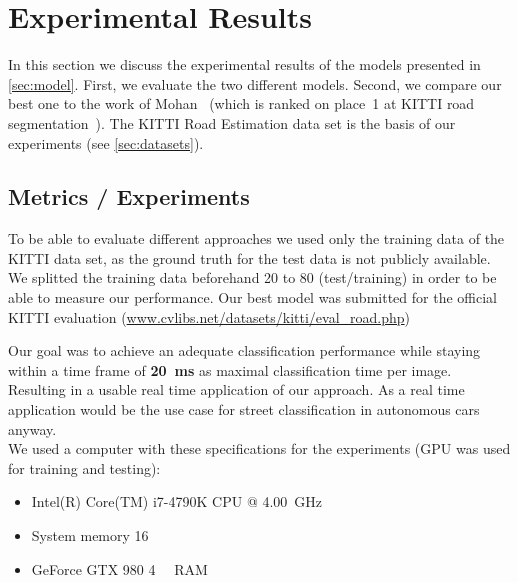 
\section{Experimental Results}\label{sec:evaluation}

In this section we discuss the experimental results of the models
presented in \cref{sec:model}. First, we evaluate the two different
models. Second, we compare our best one to the work of
Mohan~\cite{Tarel2009} (which is ranked on place~1 at KITTI road
segmentation~\cite{Tarel2009}). The KITTI Road Estimation data set is the basis
of our experiments (see \cref{sec:datasets}). \\


\subsection{Metrics / Experiments}
To be able to evaluate different approaches we used only the
training data of the KITTI data set, as the ground truth for the test data is
not publicly available. We splitted the training data beforehand 20 to 80
(test/training) in order to be able to measure our performance. Our best model
was submitted for the official KITTI evaluation
(\href{http://www.cvlibs.net/datasets/kitti/eval_road.php}{www.cvlibs.net/datasets/kitti/eval\_road.php})


Our goal was to achieve an adequate classification performance while staying
within a time frame of \textbf{\SI{20}{\milli\second}} as maximal
classification time per image. Resulting in a usable real time application of
our approach. As a real time application would be the use case for street
classification in autonomous cars anyway.\\

We used a computer with these specifications for the experiments (GPU was used
for training and testing):
\begin{itemize}
    \item Intel(R) Core(TM) i7-4790K CPU @ \SI{4.00}{\giga\hertz}
    \item System memory \SI{16}{\gibi\byte}
    \item GeForce GTX 980 \SI{4}{\gibi\byte} RAM
\end{itemize}

